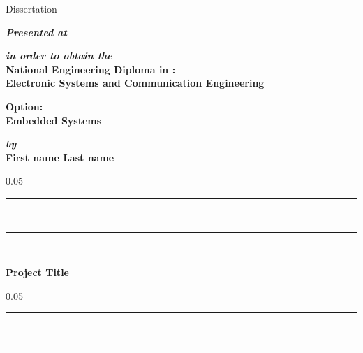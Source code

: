 \begin{titlepage}
\begin{center}

\vspace{10pt} {%
  \renewcommand*{\familydefault}{\defaultFont}
  \fontsize{36pt}{36pt}\selectfont%
  Dissertation\\%
}

\vspace{30pt}%
\textbf{\textit{Presented at}}\\



\vspace{20pt}
\textbf{\textit{in order to obtain the}}\\

\vspace{10pt}
\renewcommand*{\familydefault}{\defaultFont}
\fontsize{14pt}{14pt}\selectfont%
\textbf{%
National Engineering Diploma in :\\
Electronic Systems and Communication Engineering\\
}

\vspace{20pt}
\renewcommand*{\familydefault}{\defaultFont}
\fontsize{14pt}{14pt}\selectfont%
\textbf{%
Option:\\
Embedded Systems\\
}

\vspace{30pt}
\textbf{\textit{by}}\\
\vspace{10pt} {%
  \fontsize{18pt}{18pt}\selectfont%
  \textbf{First name Last name}\\
}%

\vspace{20pt} {%
  \begin{spacing}{0.05}
    \rule{200pt}{2pt}\\
    \rule{200pt}{0.75pt}\\
  \end{spacing}
  \renewcommand*{\familydefault}{\defaultFont}
  \fontsize{17pt}{17pt}\selectfont%
  \vspace{20pt}
  \textbf{
  Project Title\\%
  }
  \vspace{10pt}
  \begin{spacing}{0.05}
    \rule{200pt}{0.75pt}\\
    \rule{200pt}{2pt}\\
  \end{spacing}
}


\end{center}
\end{titlepage}
